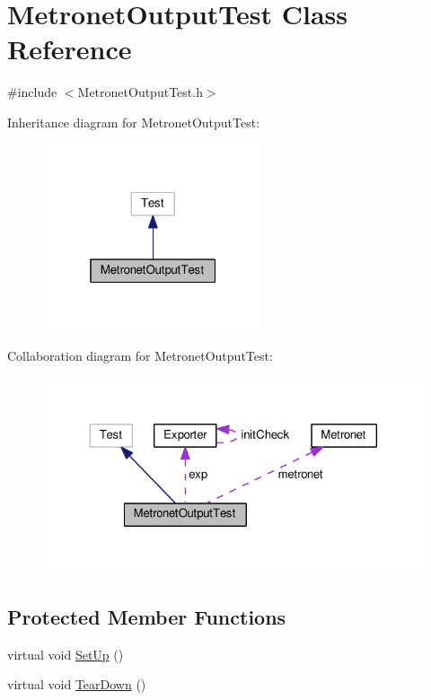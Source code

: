 \hypertarget{class_metronet_output_test}{}\section{Metronet\+Output\+Test Class Reference}
\label{class_metronet_output_test}


{\ttfamily \#include $<$Metronet\+Output\+Test.\+h$>$}



Inheritance diagram for Metronet\+Output\+Test\+:\nopagebreak
\begin{figure}[H]
\begin{center}
\leavevmode
\includegraphics[width=184pt]{class_metronet_output_test__inherit__graph}
\end{center}
\end{figure}


Collaboration diagram for Metronet\+Output\+Test\+:\nopagebreak
\begin{figure}[H]
\begin{center}
\leavevmode
\includegraphics[width=324pt]{class_metronet_output_test__coll__graph}
\end{center}
\end{figure}
\subsection*{Protected Member Functions}
\begin{DoxyCompactItemize}
\item 
virtual void \hyperlink{class_metronet_output_test_a591685e65362fe63b325e2d33189a3b0}{Set\+Up} ()
\item 
virtual void \hyperlink{class_metronet_output_test_a1390ab64ffdb3c5da39c4b27b40c170a}{Tear\+Down} ()
\end{DoxyCompactItemize}
